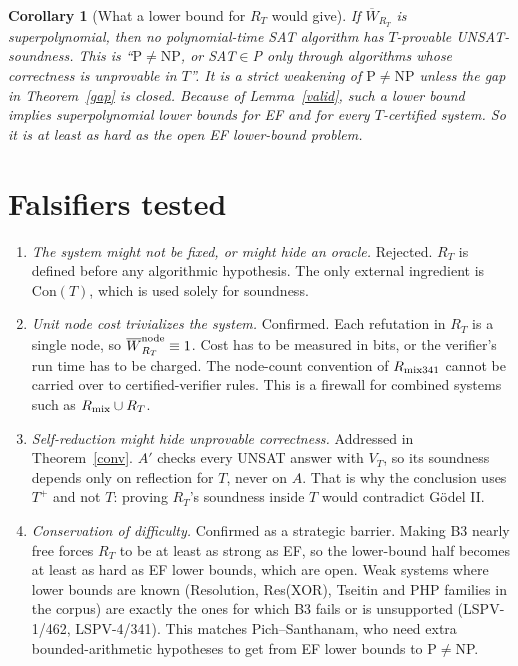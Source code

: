 \documentclass[11pt]{article}
\newtheorem{corollary}[theorem]{Corollary}
\newcommand{\Wb}{\overline W}
\begin{document}
\begin{corollary}[What a lower bound for $R_T$ would give]\label{cor}
If $\Wb_{R_T}$ is superpolynomial, then no polynomial-time SAT algorithm has $T$-provable UNSAT-soundness. This is ``$\mathrm{P}\ne\mathrm{NP}$, or SAT$\in$P only through algorithms whose correctness is unprovable in $T$''. It is a strict weakening of $\mathrm{P}\ne\mathrm{NP}$ unless the gap in Theorem~\ref{gap} is closed. Because of Lemma~\ref{valid}, such a lower bound implies superpolynomial lower bounds for EF and for every $T$-certified system. So it is at least as hard as the open EF lower-bound problem.
\end{corollary}

\section{Falsifiers tested}
\begin{enumerate}
\item[F1] \emph{The system might not be fixed, or might hide an oracle.} Rejected. $R_T$ is defined before any algorithmic hypothesis. The only external ingredient is $\mathrm{Con}(T)$, which is used solely for soundness.
\item[F2] \emph{Unit node cost trivializes the system.} Confirmed. Each refutation in $R_T$ is a single node, so $\Wb^{\rm node}_{R_T}\equiv1$. Cost has to be measured in bits, or the verifier's run time has to be charged. The node-count convention of $R_{\rm mix341}$ cannot be carried over to certified-verifier rules. This is a firewall for combined systems such as $R_{\rm mix}\cup R_T$.
\item[F3] \emph{Self-reduction might hide unprovable correctness.} Addressed in Theorem~\ref{conv}. $A'$ checks every UNSAT answer with $V_T$, so its soundness depends only on reflection for $T$, never on $A$. That is why the conclusion uses $T^+$ and not $T$: proving $R_T$'s soundness inside $T$ would contradict Gödel II.
\item[F4] \emph{Conservation of difficulty.} Confirmed as a strategic barrier. Making B3 nearly free forces $R_T$ to be at least as strong as EF, so the lower-bound half becomes at least as hard as EF lower bounds, which are open. Weak systems where lower bounds are known (Resolution, Res(XOR), Tseitin and PHP families in the corpus) are exactly the ones for which B3 fails or is unsupported (LSPV-1/462, LSPV-4/341). This matches Pich--Santhanam, who need extra bounded-arithmetic hypotheses to get from EF lower bounds to P$\ne$NP.
\end{enumerate}
\end{document}
